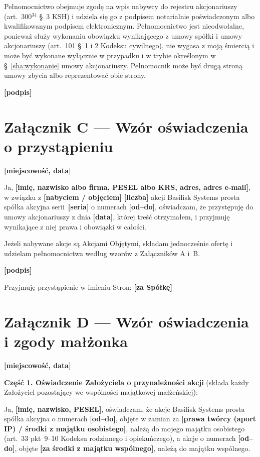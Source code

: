 \documentclass[12pt,a4paper]{report}
\newcommand{\field}[1]{\textbf{[#1]}}
\newcommand{\CompanyFull}{Basilisk Systems prosta spółka akcyjna}
\begin{document}
Pełnomocnictwo obejmuje zgodę na wpis nabywcy do rejestru akcjonariuszy (art.~300$^{34}$ §~3 KSH) i udziela się go z podpisem notarialnie poświadczonym albo kwalifikowanym podpisem elektronicznym. Pełnomocnictwo jest nieodwołalne, ponieważ służy wykonaniu obowiązku wynikającego z umowy spółki i umowy akcjonariuszy (art.~101 §~1 i 2 Kodeksu cywilnego), nie wygasa z moją śmiercią i może być wykonane wyłącznie w przypadku i w trybie określonym w §~\ref{sha:wykonanie} umowy akcjonariuszy. Pełnomocnik może być drugą stroną umowy zbycia albo reprezentować obie strony.

\field{podpis}

\newpage
\section*{Załącznik C --- Wzór oświadczenia o przystąpieniu}

\field{miejscowość, data}

Ja, \field{imię, nazwisko albo firma, PESEL albo KRS, adres, adres e-mail}, w związku z \field{nabyciem / objęciem} \field{liczba} akcji \CompanyFull{} serii~\field{seria} o numerach \field{od--do}, oświadczam, że przystępuję do umowy akcjonariuszy z dnia \field{data}, której treść otrzymałem, i przyjmuję wynikające z niej prawa i obowiązki w całości.

Jeżeli nabywane akcje są Akcjami Objętymi, składam jednocześnie ofertę i udzielam pełnomocnictwa według wzorów z Załączników A i~B.

\field{podpis}

Przyjmuję przystąpienie w imieniu Stron: \field{za Spółkę}


\newpage
\section*{Załącznik D --- Wzór oświadczenia i zgody małżonka}

\field{miejscowość, data}

\textbf{Część 1. Oświadczenie Założyciela o przynależności akcji} (składa każdy Założyciel pozostający we wspólności majątkowej małżeńskiej):

Ja, \field{imię, nazwisko, PESEL}, oświadczam, że akcje \CompanyFull{} o numerach \field{od--do}, objęte w zamian za \field{prawa twórcy (aport IP) / środki z majątku osobistego}, należą do mojego majątku osobistego (art.~33 pkt~9--10 Kodeksu rodzinnego i opiekuńczego), a akcje o numerach \field{od--do}, objęte \field{za środki z majątku wspólnego}, należą do majątku wspólnego.
\end{document}

